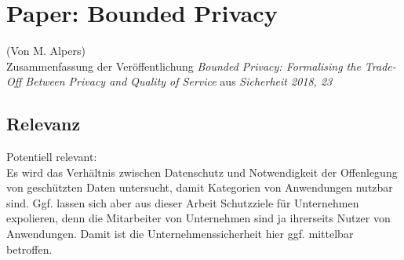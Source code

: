 \section{Paper: Bounded Privacy}
(Von M. Alpers)\\

Zusammenfassung der Veröffentlichung \emph{Bounded Privacy: Formalising the Trade-Off Between Privacy and Quality of Service} aus \emph{Sicherheit 2018, 23}\\

\subsection{Relevanz}

Potentiell relevant:\\

Es wird das Verhältnis zwischen Datenschutz und Notwendigkeit der Offenlegung von geschützten Daten untersucht, damit Kategorien von Anwendungen nutzbar sind. Ggf. lassen sich aber aus dieser Arbeit Schutzziele für Unternehmen expolieren, denn die Mitarbeiter von Unternehmen sind ja ihrerseits Nutzer von Anwendungen. Damit ist die Unternehmenssicherheit hier ggf. mittelbar betroffen.
